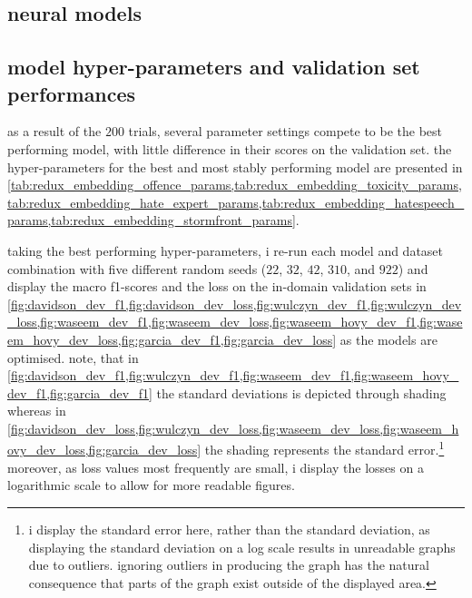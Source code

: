 \subsection{neural models}
\subsection{model hyper-parameters and validation set performances}
as a result of the $200$ trials, several parameter settings compete to be the best performing model, with little difference in their scores on the validation set.
the hyper-parameters for the best and most stably performing model are presented in \cref{tab:redux_embedding_offence_params,tab:redux_embedding_toxicity_params,tab:redux_embedding_hate_expert_params,tab:redux_embedding_hatespeech_params,tab:redux_embedding_stormfront_params}.

taking the best performing hyper-parameters, i re-run each model and dataset combination with five different random seeds ($22$, $32$, $42$, $310$, and $922$) and display the macro f1-scores and the loss on the in-domain validation sets in \cref{fig:davidson_dev_f1,fig:davidson_dev_loss,fig:wulczyn_dev_f1,fig:wulczyn_dev_loss,fig:waseem_dev_f1,fig:waseem_dev_loss,fig:waseem_hovy_dev_f1,fig:waseem_hovy_dev_loss,fig:garcia_dev_f1,fig:garcia_dev_loss} as the models are optimised.
note, that in \cref{fig:davidson_dev_f1,fig:wulczyn_dev_f1,fig:waseem_dev_f1,fig:waseem_hovy_dev_f1,fig:garcia_dev_f1} the standard deviations is depicted through shading whereas in \cref{fig:davidson_dev_loss,fig:wulczyn_dev_loss,fig:waseem_dev_loss,fig:waseem_hovy_dev_loss,fig:garcia_dev_loss} the shading represents the standard error.\footnote{i display the standard error here, rather than the standard deviation, as displaying the standard deviation on a log scale results in unreadable graphs due to outliers. ignoring outliers in producing the graph has the natural consequence that parts of the graph exist outside of the displayed area.}
moreover, as loss values most frequently are small, i display the losses on a  logarithmic scale to allow for more readable figures.

